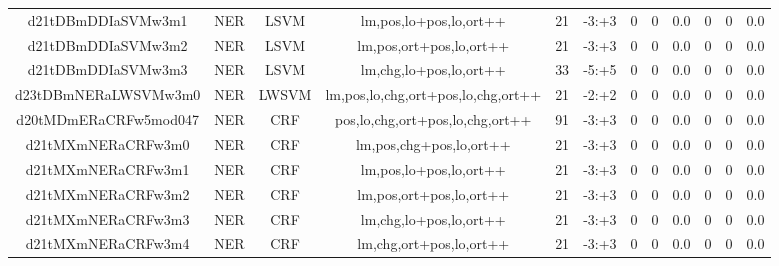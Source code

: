 \documentclass[a4paper]{article}
\begin{document}
\begin{landscape}
\begin{center}
\begin{tabular}{ |c|c|c|c|c|c|c|c|c|c|c|c|}
 	\small{ d21tDBmDDIaSVMw3m1 } & \small{ NER} & \small{  LSVM }  & lm,pos,lo+pos,lo,ort++  &  21 &  \small{  -3:+3 }  &  0 & 0 & 0.0  &  0 & 0 & 0.0 \\
 	

 
 	
 	\small{ d21tDBmDDIaSVMw3m2 } & \small{ NER} & \small{  LSVM }  & lm,pos,ort+pos,lo,ort++  &  21 &  \small{  -3:+3 }  &  0 & 0 & 0.0  &  0 & 0 & 0.0 \\
 	

 
 	
 	\small{ d21tDBmDDIaSVMw3m3 } & \small{ NER} & \small{  LSVM }  & lm,chg,lo+pos,lo,ort++  &  33 &  \small{  -5:+5 }  &  0 & 0 & 0.0  &  0 & 0 & 0.0 \\
 	

 
 	
 	\small{ d23tDBmNERaLWSVMw3m0 } & \small{ NER} & \small{  LWSVM }  & lm,pos,lo,chg,ort+pos,lo,chg,ort++  &  21 &  \small{  -2:+2 }  &  0 & 0 & 0.0  &  0 & 0 & 0.0 \\
 	

 
 	
 	\small{ d20tMDmERaCRFw5mod047 } & \small{ NER} & \small{  CRF }  & pos,lo,chg,ort+pos,lo,chg,ort++  &  91 &  \small{  -3:+3 }  &  0 & 0 & 0.0  &  0 & 0 & 0.0 \\
 	

 
 	
 	\small{ d21tMXmNERaCRFw3m0 } & \small{ NER} & \small{  CRF }  & lm,pos,chg+pos,lo,ort++  &  21 &  \small{  -3:+3 }  &  0 & 0 & 0.0  &  0 & 0 & 0.0 \\
 	

 
 	
 	\small{ d21tMXmNERaCRFw3m1 } & \small{ NER} & \small{  CRF }  & lm,pos,lo+pos,lo,ort++  &  21 &  \small{  -3:+3 }  &  0 & 0 & 0.0  &  0 & 0 & 0.0 \\
 	

 
 	
 	\small{ d21tMXmNERaCRFw3m2 } & \small{ NER} & \small{  CRF }  & lm,pos,ort+pos,lo,ort++  &  21 &  \small{  -3:+3 }  &  0 & 0 & 0.0  &  0 & 0 & 0.0 \\
 	

 
 	
 	\small{ d21tMXmNERaCRFw3m3 } & \small{ NER} & \small{  CRF }  & lm,chg,lo+pos,lo,ort++  &  21 &  \small{  -3:+3 }  &  0 & 0 & 0.0  &  0 & 0 & 0.0 \\
 	

 
 	
 	\small{ d21tMXmNERaCRFw3m4 } & \small{ NER} & \small{  CRF }  & lm,chg,ort+pos,lo,ort++  &  21 &  \small{  -3:+3 }  &  0 & 0 & 0.0  &  0 & 0 & 0.0 \\
 	


\end{tabular}
\end{center}
\end{landscape}
\end{document}
